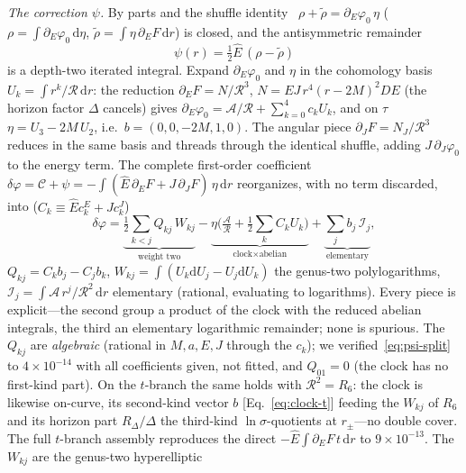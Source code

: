 \documentclass[
    aps, prd, twocolumn, superscriptaddress,
    showpacs, nofootinbib, floatfix
]{revtex4-2}
\newcommand{\Ehat}{\hat E}
\newcommand{\dd}{\mathrm{d}}
\begin{document}
\emph{The correction $\psi$.} By parts and the shuffle identity~\cite{Chen1977}
$\rho+\tilde\rho=\partial_E\varphi_0\,\eta$
($\rho=\int\partial_E\varphi_0\,\dd\eta$,
$\tilde\rho=\int\eta\,\partial_E F\,\dd r$) is closed, and the antisymmetric
remainder
\begin{equation}
    \psi(r)=\tfrac12\Ehat\,(\rho-\tilde\rho)
    \label{eq:psi-irr}
\end{equation}
is a depth-two iterated integral. Expand $\partial_E\varphi_0$ and $\eta$ in the
cohomology basis $U_k=\int r^k/\mathcal{R}\,\dd r$: the reduction
$\partial_E F=N/\mathcal{R}^3$, $N=EJ\,r^4(r-2M)^2 DE$ (the horizon factor $\Delta$
cancels) gives $\partial_E\varphi_0=\mathcal{A}/\mathcal{R}+\sum_{k=0}^4 c_k U_k$,
and on $\tau$ $\eta=U_3-2M\,U_2$, i.e.\ $b=(0,0,-2M,1,0)$. The angular piece
$\partial_J F=N_J/\mathcal{R}^3$ reduces in the same basis and threads through the
identical shuffle, adding $J\,\partial_J\varphi_0$ to the energy term. The complete
first-order coefficient
$\delta\varphi=\mathcal{C}+\psi=-\int(\Ehat\,\partial_E F+J\,\partial_J F)\,\eta\,\dd r$
reorganizes, with no term discarded, into ($C_k\equiv\Ehat c_k^{E}+J c_k^{J}$)
\begin{equation}
    \delta\varphi=
    \underbrace{\tfrac12\!\sum_{k<j}Q_{kj}\,W_{kj}}_{\text{weight two}}
    -\underbrace{\eta\big(\tfrac{\mathcal{A}}{\mathcal{R}}
    +\tfrac12\!\sum_k C_k U_k\big)}_{\text{clock}\times\text{abelian}}
    +\underbrace{\sum_j b_j\,\mathcal{I}_j}_{\text{elementary}},
    \label{eq:psi-split}
\end{equation}
$Q_{kj}=C_k b_j-C_j b_k$, $W_{kj}=\int(U_k\dd U_j-U_j\dd U_k)$ the genus-two
polylogarithms, $\mathcal{I}_j=\int\mathcal{A}\,r^j/\mathcal{R}^2\,\dd r$ elementary
(rational, evaluating to logarithms). Every piece is explicit---the second group a
product of the clock with the reduced abelian integrals, the third an elementary
logarithmic remainder; none is spurious. The $Q_{kj}$ are \emph{algebraic}
(rational in $M,a,E,J$ through the $c_k$); we verified~\eqref{eq:psi-split} to
$4\times10^{-14}$ with all coefficients given, not fitted, and $Q_{01}=0$ (the clock
has no first-kind part). On the $t$-branch the same holds with
$\mathcal{R}^2=R_6$: the clock is likewise on-curve, its second-kind vector $b$
[Eq.~\eqref{eq:clock-t}] feeding the $W_{kj}$ of $R_6$ and its horizon part
$R_\Delta/\Delta$ the third-kind $\ln\sigma$-quotients at $r_\pm$---no double cover.
The full $t$-branch assembly reproduces the direct
$-\Ehat\!\int\!\partial_E F\,t\,\dd r$ to $9\times10^{-13}$.
The $W_{kj}$ are the genus-two hyperelliptic
\end{document}
